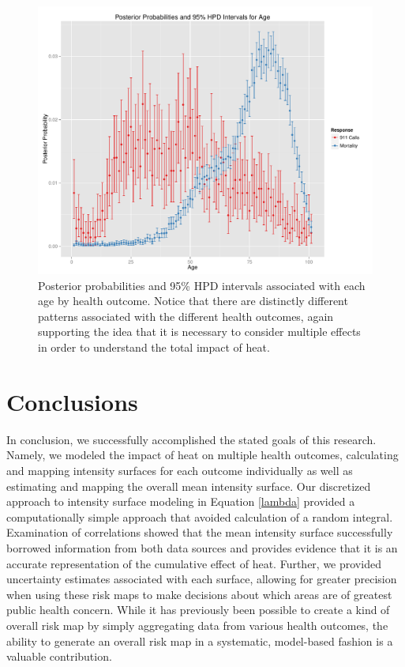 \documentclass[final]{statsoc}
\begin{document}
\begin{figure}
    \centering
    \includegraphics[width=1.0\textwidth]{imgs/pp_age.pdf}
    \caption{Posterior probabilities and 95\% HPD intervals associated with each age by health outcome. Notice that there are distinctly different patterns associated with the different health outcomes, again supporting the idea that it is necessary to consider multiple effects in order to understand the total impact of heat.}
    \label{pp-age}
\end{figure}

\section{Conclusions}
In conclusion, we successfully accomplished the stated goals of this research. Namely, we modeled the impact of heat on multiple health outcomes, calculating and mapping intensity surfaces for each outcome individually as well as estimating and mapping the overall mean intensity surface. Our discretized approach to intensity surface modeling in Equation \eqref{lambda} provided a computationally simple approach that avoided calculation of a random integral.  Examination of correlations showed that the mean intensity surface successfully borrowed information from both data sources and provides evidence that it is an accurate representation of the cumulative effect of heat. Further, we provided uncertainty estimates associated with each surface, allowing for greater precision when using these risk maps to make decisions about which areas are of greatest public health concern. While it has previously been possible to create a kind of overall risk map by simply aggregating data from various health outcomes, the ability to generate an overall risk map in a systematic, model-based fashion is a valuable contribution. 
\end{document}
